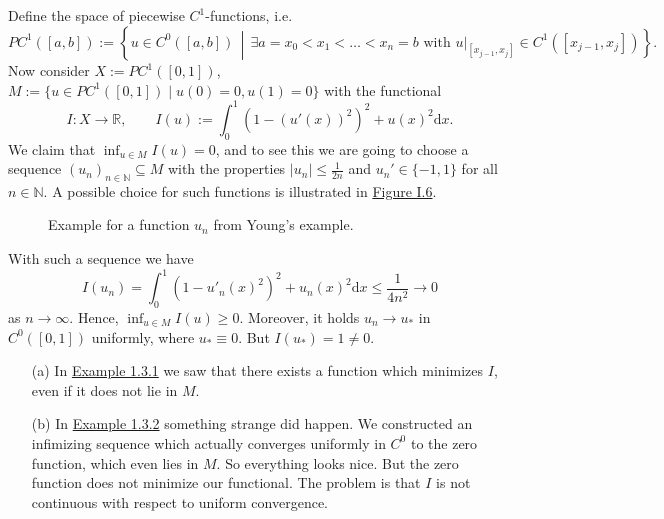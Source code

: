 \begin{example}
Define the space of piecewise $C^1$-functions, i.e.
\[PC^1([a,b]):=\left\{u\in C^0([a,b])\,\middle\vert\,\exists a=x_0<x_1<\dotsc<x_n=b\text{ with }u|_{[x_{j-1},x_j]}\in C^1([x_{j-1},x_j])\right\}.\]
Now consider $X:=PC^1([0,1])$, $M:=\{u\in PC^1([0,1])\mid u(0)=0,u(1)=0\}$ with the functional
\[I:X\longrightarrow\mathbb{R},\qquad I(u):=\int_0^1{(1-(u'(x))^2)^2+u(x)^2\mathrm{d}x}.\]
We claim that $\inf_{u\in M}{I(u)}=0$, and to see this we are going to choose a sequence $(u_n)_{n\in\mathbb{N}}\subseteq M$ with the properties $\lvert u_n\rvert\leq\frac{1}{2n}$ and $u_n'\in\{-1,1\}$ for all $n\in\mathbb{N}$. A possible choice for such functions is illustrated in \hyperref[fig:example_1_3_3]{Figure I.6}.

\begin{figure}[h]
	\centering
	\caption{Example for a function $u_n$ from Young's example.}
	\label{fig:example_1_3_3}
\end{figure}
With such a sequence we have
\[I(u_n)=\int_0^1{(1-u'_n(x)^2)^2+u_n(x)^2\mathrm{d}x}\leq\frac{1}{4n^2}\to0\]
as $n\to\infty$. Hence, $\inf_{u\in M}{I(u)}\geq0$. Moreover, it holds $u_n\to u_*$ in $C^0([0,1])$ uniformly, where $u_*\equiv0$. But $I(u_*)=1\ne0$.
\end{example}

\begin{remark}
\begin{itemize}
	\item[(a)] In \hyperlink{example_1_3_1}{Example 1.3.1} we saw that there exists a function which minimizes $I$, even if it does not lie in $M$.
	\item[(b)] In \hyperlink{example_1_3_2}{Example 1.3.2} something strange did happen. We constructed an infimizing sequence which actually converges uniformly in $C^0$ to the zero function, which even lies in $M$. So everything looks nice. But the zero function does not minimize our functional. The problem is that $I$ is not continuous with respect to uniform convergence.
\end{itemize}
\end{remark}